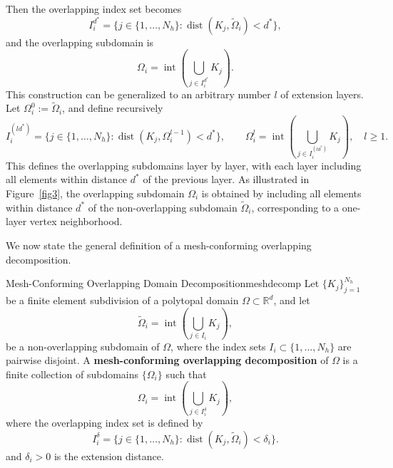 \documentclass[a4paper, 11pt]{article}
\theoremstyle{remark}
\begin{document}
\begin{enumerate}[label=(\arabic*)]
\noindent Then the overlapping index set becomes  
\begin{equation*}
    I_i^{d^{*}} = \{ j \in \{1, \ldots, N_h\} : \operatorname{dist}(K_j, \widetilde{\Omega}_i) < d^{*}\},
\end{equation*}  
and the overlapping subdomain is  
\begin{equation*}
    \Omega_i = \operatorname{int} \left(\bigcup_{j \in I_i^{d^{*}}} K_j\right).
\end{equation*}  
This construction can be generalized to an arbitrary number $l$ of extension layers. Let $\Omega_i^0 := \widetilde{\Omega}_i$, and define recursively  
\begin{equation*}
    I_i^{(ld^{*})} = \{ j \in \{1, \ldots, N_h\} : \operatorname{dist}(K_j, \Omega_i^{l-1}) < d^{*}\}, \qquad \Omega_i^l = \operatorname{int} \left(\bigcup_{j \in I_i^{(ld^{*})}} K_j \right), \quad l \geq 1.
\end{equation*}  
This defines the overlapping subdomains layer by layer, with each layer including all elements within distance $d^{*}$ of the previous layer.
%     
As illustrated in Figure~\ref{fig3}, the overlapping subdomain $\Omega_i$ is obtained by including all elements within distance $d^{*}$ of the non-overlapping subdomain $\widetilde{\Omega}_i$, corresponding to a one-layer vertex neighborhood.
\end{enumerate}
We now state the general definition of a mesh-conforming overlapping decomposition.
\begin{definition}{Mesh-Conforming Overlapping Domain Decomposition}{meshdecomp}
    Let $\{K_j\}_{j=1}^{N_{h}}$ be a finite element subdivision of a polytopal domain $\Omega\subset \mathbb{R}^{d}$, and let
    \begin{equation*}
        \widetilde{\Omega}_{i} = \operatorname{int}\left(\bigcup_{j \in I_i} K_j \right),
    \end{equation*}
    be a non-overlapping subdomain of $\Omega$, where the index sets $I_i \subset \{1, \ldots, N_h\}$ are pairwise disjoint. A \textbf{mesh-conforming overlapping decomposition} of $\Omega$ is a finite collection of subdomains $\{\Omega_i\}$ such that
    \begin{equation*}
        \Omega_i = \operatorname{int} \left(\bigcup_{j \in I_i^\delta} K_j \right),
    \end{equation*}
    where the overlapping index set is defined by  
    \begin{equation*}
        I_{i}^{\delta} = \{j \in \{1, \ldots, N_h\} : \operatorname{dist}(K_{j}, \widetilde{\Omega}_{i}) < \delta_{i}\}.
    \end{equation*}
    and $\delta_{i} > 0$ is the extension distance.
\end{definition}
\end{document}
